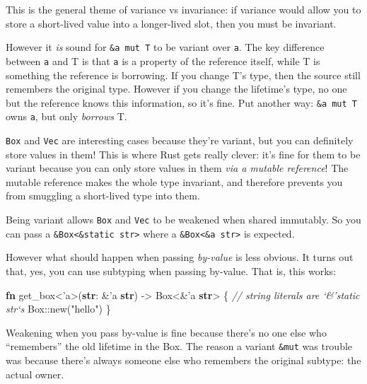 \documentclass[a4paper,]{book}
\newenvironment{Shaded}{\begin{snugshade}}{\end{snugshade}}
\newcommand{\KeywordTok}[1]{\textcolor[rgb]{0.13,0.29,0.53}{\textbf{{#1}}}}
\newcommand{\StringTok}[1]{\textcolor[rgb]{0.31,0.60,0.02}{{#1}}}
\newcommand{\CommentTok}[1]{\textcolor[rgb]{0.56,0.35,0.01}{\textit{{#1}}}}
\newcommand{\OtherTok}[1]{\textcolor[rgb]{0.56,0.35,0.01}{{#1}}}
\newcommand{\NormalTok}[1]{{#1}}
\begin{document}
This is the general theme of variance vs invariance: if variance would
allow you to store a short-lived value into a longer-lived slot, then
you must be invariant.

However it \emph{is} sound for \texttt{\&\textquotesingle{}a\ mut\ T} to
be variant over \texttt{\textquotesingle{}a}. The key difference between
\texttt{\textquotesingle{}a} and T is that \texttt{\textquotesingle{}a}
is a property of the reference itself, while T is something the
reference is borrowing. If you change T's type, then the source still
remembers the original type. However if you change the lifetime's type,
no one but the reference knows this information, so it's fine. Put
another way: \texttt{\&\textquotesingle{}a\ mut\ T} owns
\texttt{\textquotesingle{}a}, but only \emph{borrows} T.

\texttt{Box} and \texttt{Vec} are interesting cases because they're
variant, but you can definitely store values in them! This is where Rust
gets really clever: it's fine for them to be variant because you can
only store values in them \emph{via a mutable reference}! The mutable
reference makes the whole type invariant, and therefore prevents you
from smuggling a short-lived type into them.

Being variant allows \texttt{Box} and \texttt{Vec} to be weakened when
shared immutably. So you can pass a
\texttt{\&Box\textless{}\&\textquotesingle{}static\ str\textgreater{}}
where a
\texttt{\&Box\textless{}\&\textquotesingle{}a\ str\textgreater{}} is
expected.

However what should happen when passing \emph{by-value} is less obvious.
It turns out that, yes, you can use subtyping when passing by-value.
That is, this works:

\begin{Shaded}
\begin{Highlighting}[]
\KeywordTok{fn} \NormalTok{get_box<}\OtherTok{'a}\NormalTok{>(}\KeywordTok{str}\NormalTok{: &}\OtherTok{'a} \KeywordTok{str}\NormalTok{) -> Box<&}\OtherTok{'a} \KeywordTok{str}\NormalTok{> \{}
    \CommentTok{// string literals are `&'static str`s}
    \NormalTok{Box::new(}\StringTok{"hello"}\NormalTok{)}
\NormalTok{\}}
\end{Highlighting}
\end{Shaded}

Weakening when you pass by-value is fine because there's no one else who
``remembers'' the old lifetime in the Box. The reason a variant
\texttt{\&mut} was trouble was because there's always someone else who
remembers the original subtype: the actual owner.
\end{document}
